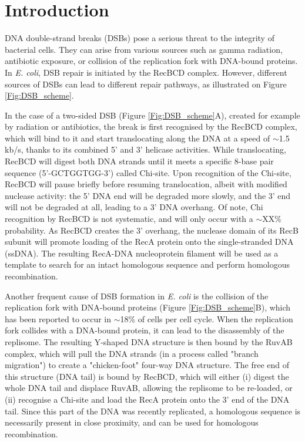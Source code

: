 \section*{Introduction}

DNA double-strand breaks (DSBs) pose a serious threat to the integrity of bacterial cells. They can arise from various sources such as gamma radiation, antibiotic exposure, or collision of the replication fork with DNA-bound proteins. In \emph{E. coli}, DSB repair is initiated by the RecBCD complex. However, different sources of DSBs can lead to different repair pathways, as illustrated on Figure \ref{Fig:DSB_scheme}.

In the case of a two-sided DSB (Figure \ref{Fig:DSB_scheme}A), created for example by radiation or antibiotics, the break is first recognised by the RecBCD complex, which will bind to it and start translocating along the DNA at a speed of $\sim$1.5 kb/s, thanks to its combined 5' and 3' helicase activities. While translocating, RecBCD will digest both DNA strands until it meets a specific 8-base pair sequence (5'-GCTGGTGG-3') called Chi-site. Upon recognition of the Chi-site, RecBCD will pause briefly before resuming translocation, albeit with modified nuclease activity: the 5' DNA end will be degraded more slowly, and the 3' end will not be degraded at all, leading to a 3' DNA overhang. Of note, Chi recognition by RecBCD is not systematic, and will only occur with a $\sim$XX\% probability. As RecBCD creates the 3' overhang, the nuclease domain of its RecB subunit will promote loading of the RecA protein onto the single-stranded DNA (ssDNA). The resulting RecA-DNA nucleoprotein filament will be used as a template to search for an intact homologous sequence and perform homologous recombination.

Another frequent cause of DSB formation in \emph{E. coli} is the collision of the replication fork with DNA-bound proteins (Figure \ref{Fig:DSB_scheme}B), which has been reported to occur in $\sim$18\% of cells per cell cycle.\cite{Sinha2018} When the replication fork collides with a DNA-bound protein, it can lead to the disassembly of the replisome. The resulting Y-shaped DNA structure is then bound by the RuvAB complex, which will pull the DNA strands (in a process called "branch migration") to create a "chicken-foot" four-way DNA structure. The free end of this structure (DNA tail) is bound by RecBCD, which will either (i) digest the whole DNA tail and displace RuvAB, allowing the replisome to be re-loaded, or (ii) recognise a Chi-site and load the RecA protein onto the 3' end of the DNA tail. Since this part of the DNA was recently replicated, a homologous sequence is necessarily present in close proximity, and can be used for homologous recombination.

